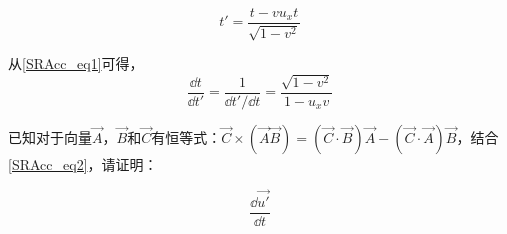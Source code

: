 \begin{equation}\label{SRAcc_eq1}
t'=\frac{t-vu_xt}{\sqrt{1-v^2}}
\end{equation}

从\autoref{SRAcc_eq1}可得，
\begin{equation}
\frac{\dd t}{\dd t'}=\frac{1}{\dd t'/\dd t}=\frac{\sqrt{1-v^2}}{1-u_xv}
\end{equation}

\begin{exercise}{}

已知对于向量$\vec{A}$，$\vec{B}$和$\vec{C}$有恒等式：$\vec{C}\times(\vec{A}\vec{B})=(\vec{C}\cdot\vec{B})\vec{A}-(\vec{C}\cdot\vec{A})\vec{B}$，结合\autoref{SRAcc_eq2}，请证明：

\begin{equation}

\frac{\dd \vec{u'} }{\dd t}

\end{equation}

\end{exercise}
